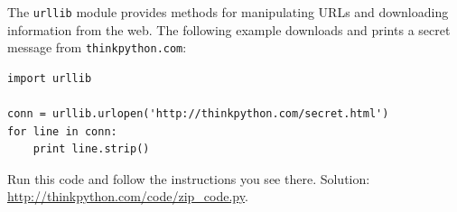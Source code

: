 \documentclass[10pt]{book}
\begin{document}
\begin{exercise}
\label{urllib}

The {\tt urllib} module provides methods for manipulating URLs
and downloading information from the web.  The following example
downloads and prints a secret message from {\tt thinkpython.com}:

\begin{verbatim}
import urllib

conn = urllib.urlopen('http://thinkpython.com/secret.html')
for line in conn:
    print line.strip()
\end{verbatim}

Run this code and follow the instructions you see there.
Solution: \url{http://thinkpython.com/code/zip_code.py}.

\end{exercise}





%



\end{document}
